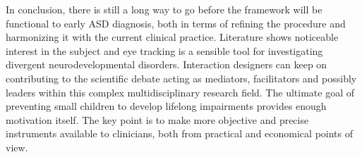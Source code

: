 In conclusion, there is still a long way to go before the framework will be functional to early ASD diagnosis, both in terms of refining the procedure and harmonizing it with the current clinical practice. Literature shows noticeable interest in the subject and eye tracking is a sensible tool for investigating divergent neurodevelopmental disorders. Interaction designers can keep on contributing to the scientific debate acting as mediators, facilitators and possibly leaders within this complex multidisciplinary research field. The ultimate goal of preventing small children to develop lifelong impairments provides enough motivation itself. The key point is to make more objective and precise instruments available to clinicians, both from practical and economical points of view.
